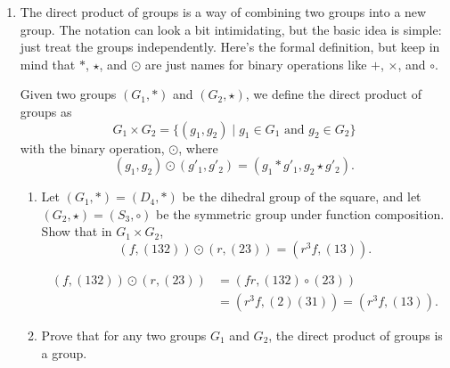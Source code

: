 \documentclass{article}
\begin{document}
\begin{enumerate}
{\begin{enumerate}
{\begin{enumerate}
{\begin{proof}
                    Suppose we have \(D_n\) where \(n > 2\). We choose the element
                    \(rf \in D_n\). Now, \(rf = fr^{n-1} \not= fr\), so \(D_n\) is 
                    not abelian. 

                    Therefore, \(D_n\) is abelian if and only if \(n \leq 2\).
                \end{proof}
            }
        \end{enumerate}
    }

    \item {
        The direct product of groups is a way of combining two groups into a new group. The notation can look a bit intimidating, but the basic idea is simple: just treat the groups independently. Here's the formal definition, but keep in mind that \(*\), \(\star\), and \(\odot\) are just names for binary operations like \(+\), \(\times\), and \(\circ\).
      
        Given two groups \((G_1,*)\) and \((G_2,\star)\), we define the direct product of groups as \[           G_1 \times G_2 = \{(g_1, g_2) \mid g_1 \in G_1 \text{ and } g_2 \in G_2\}         \] with the binary operation, \(\odot\), where \[           (g_1, g_2)\odot(g'_1,g'_2) = (g_1 * g'_1, g_2 \star g'_2).         \]
      
        \begin{enumerate}
            \item {
                Let \({(G_1, *) = (D_4, *)}\) be the dihedral group of the square, 
                and let \({(G_2, \star) = (S_3, \circ)}\) be the symmetric group 
                under function composition.  Show that in \(G_1 \times G_2\), 
                \[\left(f, (132) \right) \odot \left(r, (23) \right) = \left(r^3f, (13) \right).\]

                \begin{align}
                    \left(f, (132) \right) \odot \left(r, (23) \right) 
                        &= (fr, (132) \circ (23)) \\
                        & = (r^3f, (2)(31)) = (r^3f, (13)).
                \end{align}
            }
            
            \item {
                Prove that for any two groups \(G_1\) and \(G_2\), the direct product of groups is a group.
                
}
\end{enumerate}}
\end{enumerate}}
\end{enumerate}
\end{document}
